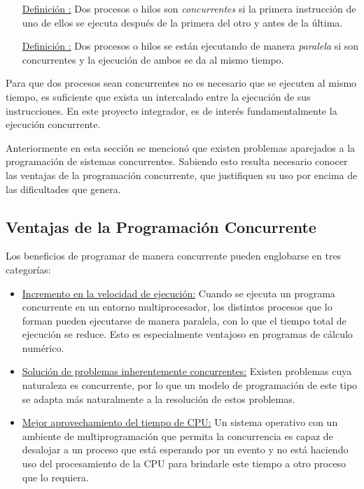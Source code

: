 \begin{itemize}
	\item [\underline{Definición \thedefinitionsCounter :} ] Dos procesos
	o hilos son \textit{concurrentes} si la primera instrucción de uno de ellos se
	ejecuta después de la primera del otro y antes de la última.
	\item [\underline{Definición \thedefinitionsCounter :} ] Dos procesos o hilos
	se están ejecutando de manera \textit{paralela} si son concurrentes y la
	ejecución de ambos se da al mismo tiempo.
\end{itemize}

Para que dos procesos sean concurrentes no es necesario que se ejecuten al mismo
tiempo, es suficiente que exista un intercalado entre la ejecución de sus
instrucciones. En este proyecto integrador, es de interés fundamentalmente la
ejecución concurrente.

Anteriormente en esta sección se mencionó que existen problemas aparejados a la
programación de sistemas concurrentes. Sabiendo esto resulta necesario conocer
las ventajas de la programación concurrente, que justifiquen su uso por encima de
las dificultades que genera.

\subsection{Ventajas de la Programación Concurrente}

Los beneficios de programar de manera concurrente pueden englobarse en tres
categorías:

\begin{itemize}
	\item \underline{Incremento en la velocidad de ejecución:} Cuando se ejecuta un
	programa concurrente en un entorno multiprocesador, los distintos procesos que
	lo forman pueden ejecutarse de manera paralela, con lo que el tiempo total de
	ejecución se reduce. Esto es especialmente ventajoso en programas de cálculo
	numérico.
	\item \underline{Solución de problemas inherentemente concurrentes:} Existen
	problemas cuya naturaleza es concurrente, por lo que un modelo de programación
	de este tipo se adapta más naturalmente a la resolución de estos problemas.
	\item \underline{Mejor aprovechamiento del tiempo de CPU:} Un sistema operativo
	con un ambiente de multiprogramación que permita la concurrencia es capaz de
	desalojar a un proceso que está esperando por un evento y no está haciendo uso
	del procesamiento de la CPU para brindarle este tiempo a otro proceso que lo
	requiera.
\end{itemize}

